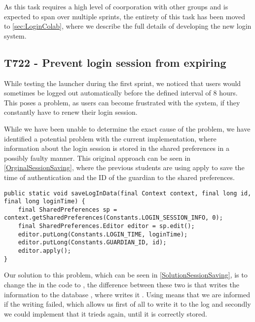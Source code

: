 As this task requires a high level of coorporation with other groups and is
expected to span over multiple sprints, the entirety of this task has been moved
to \autoref{sec:LoginColab}, where we describe the full details of developing
the new login system.

\subsection{T722 - Prevent login session from expiring}
While testing the launcher during the first sprint, we noticed that users would
sometimes be logged out automatically before the defined interval of 8
hours. This poses a problem, as users can become frustrated with the system,
if they constantly have to renew their login session.\nl

While we have been unable to determine the exact cause of the problem, we have
identified a potential problem with the current implementation, where
information about the login session is stored in the shared preferences in a possibly faulty manner. This original approach can be seen in
\autoref{OrginalSessionSaving}, where the previous students are using apply to
save the time of authentication and the ID of the guardian to the shared
preferences.\nl

\begin{minipage}[H]{\linewidth}
\begin{lstlisting}[caption = Original approach to saving login session, label =
OrginalSessionSaving]
public static void saveLogInData(final Context context, final long id, final long loginTime) {
    final SharedPreferences sp = context.getSharedPreferences(Constants.LOGIN_SESSION_INFO, 0);
    final SharedPreferences.Editor editor = sp.edit();
    editor.putLong(Constants.LOGIN_TIME, loginTime);
    editor.putLong(Constants.GUARDIAN_ID, id);
    editor.apply();
}
\end{lstlisting} 
\end{minipage}

Our solution to this problem, which can be seen in
\autoref{SolutionSessionSaving}, is to change the  in the code to
, the difference between these two is that  writes
the information to the database , where 
writes it . Using  means that we are informed
if the writing failed, which allows us first of all to write it to the log and
secondly we could implement that it trieds again, until it is correctly
stored.\nl

